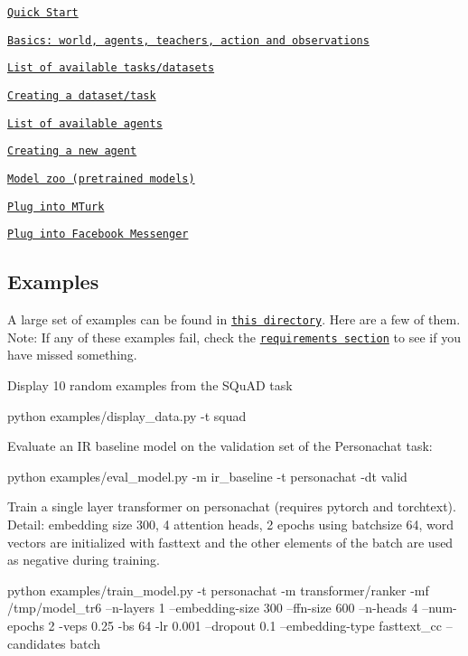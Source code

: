 \begin{DoxyItemize}
\item \href{https://parl.ai/docs/tutorial_quick.html}{\tt Quick Start}
\item \href{https://parl.ai/docs/tutorial_basic.html}{\tt Basics\+: world, agents, teachers, action and observations}
\item \href{https://parl.ai/docs/tasks.html}{\tt List of available tasks/datasets}
\item \href{http://www.parl.ai/docs/tutorial_task.html}{\tt Creating a dataset/task}
\item \href{./parlai/agents}{\tt List of available agents}
\item \href{https://parl.ai/docs/tutorial_seq2seq.html#}{\tt Creating a new agent}
\item \href{https://parl.ai/docs/zoo.html}{\tt Model zoo (pretrained models)}
\item \href{http://parl.ai/docs/tutorial_mturk.html}{\tt Plug into M\+Turk}
\item \href{http://parl.ai/docs/tutorial_messenger.html}{\tt Plug into Facebook Messenger}
\end{DoxyItemize}

\subsection*{Examples}

A large set of examples can be found in \href{./examples}{\tt this directory}. Here are a few of them. Note\+: If any of these examples fail, check the \href{#requirements}{\tt requirements section} to see if you have missed something.

Display 10 random examples from the S\+Qu\+AD task 
\begin{DoxyCode}
python examples/display\_data.py -t squad
\end{DoxyCode}


Evaluate an IR baseline model on the validation set of the Personachat task\+: 
\begin{DoxyCode}
python examples/eval\_model.py -m ir\_baseline -t personachat -dt valid
\end{DoxyCode}


Train a single layer transformer on personachat (requires pytorch and torchtext). Detail\+: embedding size 300, 4 attention heads, 2 epochs using batchsize 64, word vectors are initialized with fasttext and the other elements of the batch are used as negative during training. 
\begin{DoxyCode}
python examples/train\_model.py -t personachat -m transformer/ranker -mf /tmp/model\_tr6 --n-layers 1
       --embedding-size 300 --ffn-size 600 --n-heads 4 --num-epochs 2 -veps 0.25 -bs 64 -lr 0.001 --dropout 0.1
       --embedding-type fasttext\_cc --candidates batch
\end{DoxyCode}


